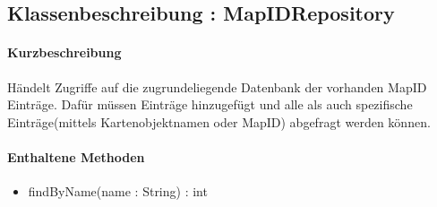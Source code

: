 \subsection{Klassenbeschreibung : MapIDRepository}%
\paragraph*{Kurzbeschreibung}
Händelt Zugriffe auf die zugrundeliegende Datenbank der vorhanden MapID Einträge.
Dafür müssen Einträge hinzugefügt und alle als auch spezifische Einträge(mittels Kartenobjektnamen oder MapID) 
abgefragt werden können.
\paragraph*{Enthaltene Methoden}
\begin{itemize}
    \item findByName(name : String) : int
\end{itemize}
